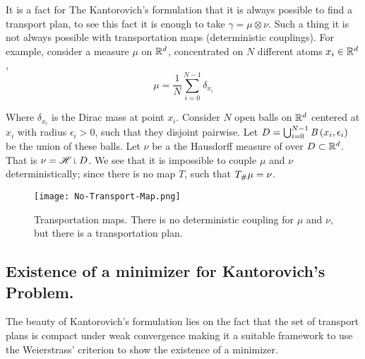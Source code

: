 It is a fact for The Kantorovich's formulation that it is always possible to find a transport plan, to see this fact it is enough to take $\gamma=\mu\otimes \nu$. Such a thing it is not always possible with transportation maps (deterministic couplings). For example, consider a measure $\mu$ on $\mathbb{R}^d$, concentrated on $N$ different atoms $x_i \in \mathbb{R}^d$, 
\begin{equation*}
\mu=\frac{1}{N}\sum_{i=0}^{N-1} \delta_{x_i}
\end{equation*} 

Where $\delta_{x_i}$ is the Dirac mass at point $x_i$. Consider $N$ open balls on $\mathbb{R}^d$ centered at $x_i$ with radius $\epsilon_i > 0$, such that they disjoint pairwise. Let $D=\bigcup_{i=0}^{N-1} \mathit{B}\left( x_i, \epsilon_i \right)$ be the union of these balls. Let $\nu$ be a the Hausdorff measure of over $D\subset \mathbb{R}^d$. That is $\nu=\Hausdorff\measurerestr D$. We see that it is impossible to couple $\mu$ and $\nu$ deterministically; since there is no map $T$, such that ${T}_{\#} \mu=\nu$. \\

\begin{figure}[H]	
	\begin{center}
	\caption{Transportation maps. There is no deterministic coupling for $\mu$ and $\nu$, but there is a transportation plan.}
	\texttt{[image: No-Transport-Map.png]}
	\label{fig: No deterministic coupling.}
	\end{center}	
\end{figure}


\subsection{Existence of a minimizer for Kantorovich's Problem.}

The beauty of Kantorovich's formulation lies on the fact that the set of transport plans is compact under weak convergence making it a suitable framework to use the Weierstrass' criterion to show the existence of a minimizer. 

